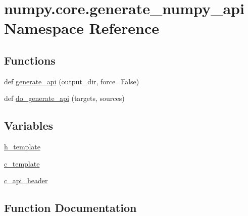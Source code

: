 \hypertarget{namespacenumpy_1_1core_1_1generate__numpy__api}{}\section{numpy.\+core.\+generate\+\_\+numpy\+\_\+api Namespace Reference}
\label{namespacenumpy_1_1core_1_1generate__numpy__api}
\subsection*{Functions}
\begin{DoxyCompactItemize}
\item 
def \hyperlink{namespacenumpy_1_1core_1_1generate__numpy__api_a7731e68377dbb7c079f36e115d4e8049}{generate\+\_\+api} (output\+\_\+dir, force=False)
\item 
def \hyperlink{namespacenumpy_1_1core_1_1generate__numpy__api_a99dec9b2af3fd88a4948af4af551200f}{do\+\_\+generate\+\_\+api} (targets, sources)
\end{DoxyCompactItemize}
\subsection*{Variables}
\begin{DoxyCompactItemize}
\item 
\hyperlink{namespacenumpy_1_1core_1_1generate__numpy__api_a271c122bea98affed9b53c8937d348cd}{h\+\_\+template}
\item 
\hyperlink{namespacenumpy_1_1core_1_1generate__numpy__api_a29518f94a363e388ac21601a5a7258d2}{c\+\_\+template}
\item 
\hyperlink{namespacenumpy_1_1core_1_1generate__numpy__api_a88523a714843a98a6cac5204eada3b16}{c\+\_\+api\+\_\+header}
\end{DoxyCompactItemize}


\subsection{Function Documentation}
\mbox{\label{namespacenumpy_1_1core_1_1generate__numpy__api_a99dec9b2af3fd88a4948af4af551200f}} 
